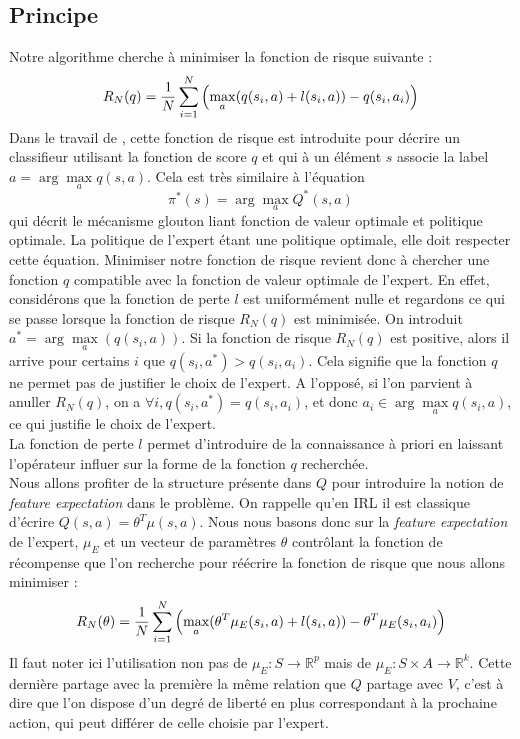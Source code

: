 \documentclass[publibook-draft]{CAp2012}
\begin{document}
\subsection{Principe}
Notre algorithme cherche à minimiser la fonction de risque suivante :
\begin{equation}
  R_N(q) = {1\over N} \sum_{i=1}^N\left(\max_{a}(q(s_i,a) + l(s_i,a)) - q(s_i,a_i) \right)
\end{equation}
Dans le travail de \citep{ratliff2007imitation}, cette fonction de risque est introduite pour décrire un classifieur utilisant la fonction de score $q$ et qui à un élément $s$ associe la label $a = \arg\max\limits_a q(s,a)$. Cela est très similaire à l'équation
  \begin{equation}
  \label{greedy.eqn}
  \pi^*(s) = \arg\max_{a} Q^*(s,a)
  \end{equation}
  qui décrit le mécanisme glouton liant fonction de valeur optimale et politique optimale. La politique de l'expert étant une politique optimale, elle doit respecter cette équation. Minimiser notre fonction de risque revient donc à chercher une fonction $q$ compatible avec la fonction de valeur optimale de l'expert. En effet, considérons que la fonction de perte $l$ est uniformément nulle et regardons ce qui se passe lorsque la fonction de risque $R_N(q)$ est minimisée. On introduit $a^* = \arg\max\limits_a(q(s_i,a))$. Si la fonction de risque $R_N(q)$ est positive, alors il arrive pour certains $i$ que $q(s_i,a^*) > q(s_i,a_i)$. Cela signifie que la fonction $q$ ne permet pas de justifier le choix de l'expert. A l'opposé, si l'on parvient à anuller $R_N(q)$, on a $\forall i, q(s_i,a^*) = q(s_i,a_i)$, et donc $a_i \in \arg\max\limits_a q(s_i,a)$, ce qui justifie le choix de l'expert.\\

   La fonction de perte $l$ permet d'introduire de la connaissance à priori en laissant l'opérateur influer sur la forme de la fonction $q$ recherchée.\\

   Nous allons profiter de la structure présente dans $Q$ pour introduire la notion de \emph{feature expectation} dans le problème. On rappelle qu'en IRL il est classique d'écrire $Q(s,a) = \theta^T \mu(s,a)$. Nous nous basons donc sur la \emph{feature expectation} de l'expert, $\mu_E$ et un vecteur de paramètres $\theta$ contrôlant la fonction de récompense que l'on recherche pour réécrire la fonction de risque que nous allons minimiser :
  \begin{equation}
   R_N(\theta) = {1\over N} \sum_{i=1}^N\left(\max_{a}(\theta ^T \mu_E(s_i,a) + l(s_i,a)) - \theta ^T \mu_E(s_i,a_i) \right)
   \end{equation}
   Il faut noter ici l'utilisation non pas de $\mu_E : S\rightarrow \mathbb{R}^p$ mais de $\mu_E : S\times A \rightarrow \mathbb{R}^k$. Cette dernière partage avec la première la même relation que $Q$ partage avec $V$, c'est à dire que l'on dispose d'un degré de liberté en plus correspondant à la prochaine action, qui peut différer de celle choisie par l'expert.
\end{document}
